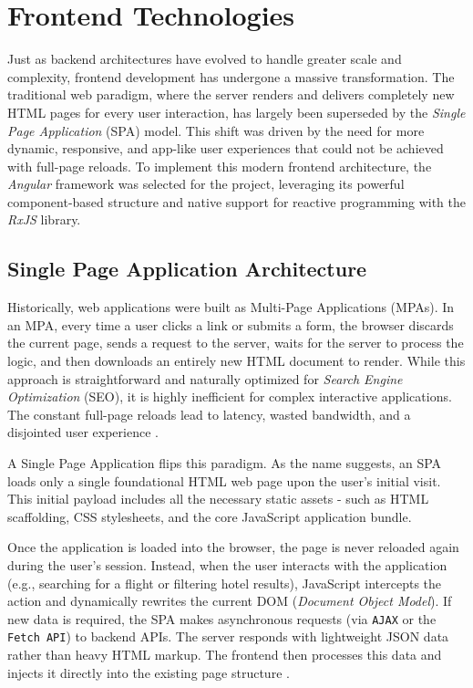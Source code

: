 
\section{Frontend Technologies}
\label{sec:frontend_technologies}

Just as backend architectures have evolved to handle greater scale and complexity, frontend development has undergone a massive transformation. The traditional web paradigm, where the server renders and delivers completely new HTML pages for every user interaction, has largely been superseded by the \textit{Single Page Application} (\gls{SPA}) model. This shift was driven by the need for more dynamic, responsive, and app-like user experiences that could not be achieved with full-page reloads. To implement this modern frontend architecture, the \textit{Angular} framework was selected for the project, leveraging its powerful component-based structure and native support for reactive programming with the \textit{RxJS} library.
 
\subsection{Single Page Application Architecture}

Historically, web applications were built as Multi-Page Applications (\gls{MPA}s). In an \gls{MPA}, every time a user clicks a link or submits a form, the browser discards the current page, sends a request to the server, waits for the server to process the logic, and then downloads an entirely new HTML document to render. While this approach is straightforward and naturally optimized for \textit{Search Engine Optimization} (\gls{SEO}), it is highly inefficient for complex interactive applications. The constant full-page reloads lead to latency, wasted bandwidth, and a disjointed user experience \cite{adobe_spa_benefits}.

A Single Page Application flips this paradigm. As the name suggests, an \gls{SPA} loads only a single foundational HTML web page upon the user's initial visit. This initial payload includes all the necessary static assets - such as HTML scaffolding, CSS stylesheets, and the core JavaScript application bundle. 

Once the application is loaded into the browser, the page is never reloaded again during the user's session. Instead, when the user interacts with the application (e.g., searching for a flight or filtering hotel results), JavaScript intercepts the action and dynamically rewrites the current \gls{DOM} (\textit{Document Object Model}). If new data is required, the SPA makes asynchronous requests (via \texttt{\gls{AJAX}} or the \texttt{Fetch API}) to backend APIs. The server responds with lightweight \gls{JSON} data rather than heavy HTML markup. The frontend then processes this data and injects it directly into the existing page structure \cite{adobe_spa_benefits}.

